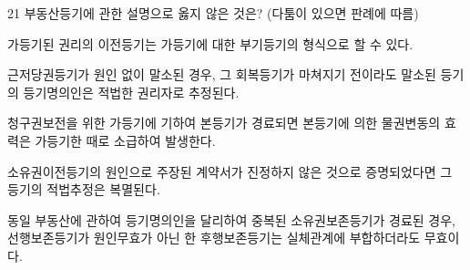 \begin{question}{21}
부동산등기에 관한 설명으로 옳지 않은 것은? (다툼이 있으면 판례에 따름)
\begin{choices}
  \item 가등기된 권리의 이전등기는 가등기에 대한 부기등기의 형식으로 할 수 있다.
  \item 근저당권등기가 원인 없이 말소된 경우, 그 회복등기가 마쳐지기 전이라도 말소된 등기의 등기명의인은 적법한 권리자로 추정된다.
  \item 청구권보전을 위한 가등기에 기하여 본등기가 경료되면 본등기에 의한 물권변동의 효력은 가등기한 때로 소급하여 발생한다.
  \item 소유권이전등기의 원인으로 주장된 계약서가 진정하지 않은 것으로 증명되었다면 그 등기의 적법추정은 복멸된다.
  \item 동일 부동산에 관하여 등기명의인을 달리하여 중복된 소유권보존등기가 경료된 경우, 선행보존등기가 원인무효가 아닌 한 후행보존등기는 실체관계에 부합하더라도 무효이다.
\end{choices}
\end{question}

